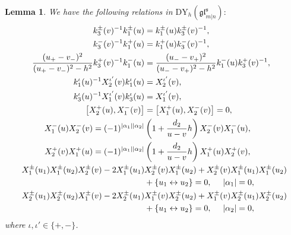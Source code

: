 \documentclass[a4paper,12pt]{article}
\newtheorem{lemm}[theo]{Lemma}
\numberwithin{equation}{section}
\begin{document}
\begin{lemm}
We have the following relations in $\mathrm{DY}_{h}(\mathfrak{gl}^{\mathfrak{s}}_{m|n}):$
\begin{align}\label{k3k1}
k_{3}^{\pm}(v)^{-1}k_{1}^{\pm}(u)&=
k_{1}^{\pm}(u)k_{3}^{\pm}(v)^{-1},\\ \label{k3-k1+}
k_{3}^{-}(v)^{-1}k_{1}^{+}(u)&=k_{1}^{+}(u)k_{3}^{-}(v)^{-1},\\ \label{k3+k1-}
\frac{(u_{+}-v_{-})^{2}}{(u_{+}-v_{-})^{2}-h^{2}}k_{3}^{+}(v)^{-1}k_{1}^{-}(u)&=
\frac{(u_{-}-v_{+})^{2}}{(u_{-}-v_{+})^{2}-h^{2}}k_{1}^{-}(u)k_{3}^{+}(v)^{-1},\\ \label{k1x2}
k_{1}^{\iota}(u)^{-1}
X_{2}^{\iota'}(v)k_{1}^{\iota}(u)&=X_{2}^{\iota'}(v),\\ \label{k3x1}
k_{3}^{\iota}(u)^{-1}
X_{1}^{\iota'}(v)k_{3}^{\iota}(u)&=X_{1}^{\iota'}(v),\\
\label{x1x2}
\left[X_{2}^{+}(u),X_{1}^{-}(v)\right]&=\left[X_{1}^{+}(u),X_{2}^{-}(v)\right]=0,\\ \label{X1X2-}
X_{1}^{-}(u)X_{2}^{-}(v)=(-1)^{|\alpha_{1}||\alpha_{2}|}&\left(1+\frac{d_{2}}{u-v}h\right)X_{2}^{-}(v)X_{1}^{-}(u),\\ \label{X2X1+}
X_{2}^{+}(v)X_{1}^{+}(u)=(-1)^{|\alpha_{1}||\alpha_{2}|}&\left(1+\frac{d_{2}}{u-v}h\right)X_{1}^{+}(u)X_{2}^{+}(v),\\ \notag
X_{1}^{\pm}(u_{1})X_{1}^{\pm}(u_{2})X_{2}^{\pm}(v)-2
X_{1}^{\pm}(u_{1})&X_{2}^{\pm}(v)X_{1}^{\pm}(u_{2})+X_{2}^{\pm}(v)X_{1}^{\pm}(u_{1})X_{1}^{\pm}(u_{2})\\ 
\label{serre3-1}
&+\{u_{1}\leftrightarrow u_{2}\}=0, \quad~|\alpha_{1}|=0,\\ \notag
X_{2}^{\pm}(u_{1})X_{2}^{\pm}(u_{2})X_{1}^{\pm}(v)-2 X_{2}^{\pm}(u_{1})&X_{1}^{\pm}(v)X_{2}^{\pm}(u_{2})+X_{1}^{\pm}(v)X_{2}^{\pm}(u_{1})X_{2}^{\pm}(u_{2})\\ \label{serre3-2}
&+\{u_{1}\leftrightarrow u_{2}\}=0, \quad~|\alpha_{2}|=0,
\end{align}
where $\iota,\iota'\in\{+,-\}$.
\end{lemm}
\end{document}
